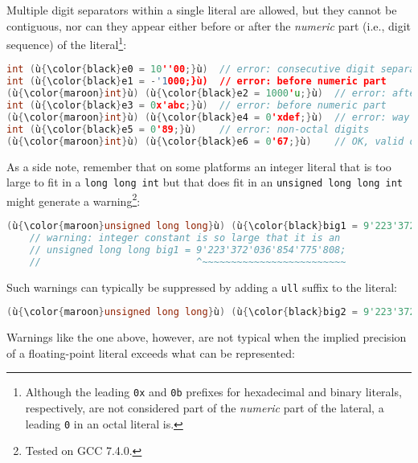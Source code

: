 \noindent Multiple digit separators within a single literal are allowed, but they
cannot be contiguous, nor can they appear either before or after the
\emph{numeric} part (i.e., digit sequence) of the
literal{\cprotect\footnote{Although the leading \texttt{0x} and
\texttt{0b} prefixes for hexadecimal and binary literals,
respectively, are not considered part of the \emph{numeric} part of
  the lateral, a leading \texttt{0} in an octal literal is.}}:

\begin{lstlisting}[language=C++]
int (ù{\color{black}e0 = 10''00;}ù)  // error: consecutive digit separators
int (ù{\color{black}e1 = -'1000;}ù)  // error: before numeric part
(ù{\color{maroon}int}ù) (ù{\color{black}e2 = 1000'u;}ù)  // error: after numeric part
int (ù{\color{black}e3 = 0x'abc;}ù)  // error: before numeric part
(ù{\color{maroon}int}ù) (ù{\color{black}e4 = 0'xdef;}ù)  // error: way before numeric part
int (ù{\color{black}e5 = 0'89;}ù)    // error: non-octal digits
(ù{\color{maroon}int}ù) (ù{\color{black}e6 = 0'67;}ù)    // OK, valid octal literal
\end{lstlisting}

\noindent As a side note, remember that on some platforms an integer literal
that is too large to fit in a \texttt{long}~\texttt{long}~\texttt{int} but that does fit in an
\texttt{unsigned}~\texttt{long}~\texttt{long}~\texttt{int} might
generate a warning{\cprotect\footnote{Tested on GCC 7.4.0.}}:

\begin{lstlisting}[language=C++]
(ù{\color{maroon}unsigned long long}ù) (ù{\color{black}big1 = 9'223'372'036'854'775'808;}ù)  // (ù{\codeincomments{2\^{}63}}ù)
    // warning: integer constant is so large that it is an
    // unsigned long long big1 = 9'223'372'036'854'775'808;
    //                           ^~~~~~~~~~~~~~~~~~~~~~~~~~
\end{lstlisting}

\noindent Such warnings can typically be suppressed by adding a \texttt{ull}
suffix to the literal:

\begin{lstlisting}[language=C++]
(ù{\color{maroon}unsigned long long}ù) (ù{\color{black}big2 = 9'223'372'036'854'775'808ull;}ù)  // OK
\end{lstlisting}

\noindent Warnings like the one above, however, are not typical when the implied
precision of a floating-point literal exceeds what can be represented:

